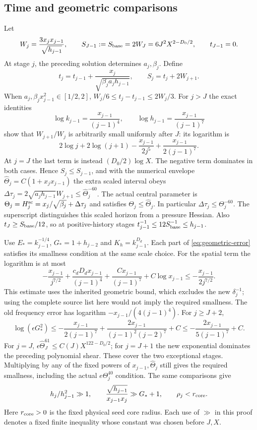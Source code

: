 \documentclass[11pt]{article}
\theoremstyle{definition}
\begin{document}
\subsection{Time and geometric comparisons}
Let
\[
 W_j=\frac{3x_jx_{j-1}}{\sqrt{h_{j-1}}},\qquad
 S_{J-1}:=S_{\rm base}=2W_J=6J^2X^{2-D_0/2},\qquad t_{J-1}=0.
\]
At stage $j$, the preceding solution determines $a_j,\beta_j$.
Define
\begin{equation}\label{eq:actual-times}
 t_j=t_{j-1}+\frac{x_j}{\sqrt{\beta_ja_jh_{j-1}}},
 \qquad S_j=t_j+2W_{j+1}.
\end{equation}
When $a_j,\beta_jx_{j-1}^2\in[1/2,2]$,
$W_j/6\leq t_j-t_{j-1}\leq2W_j/3$.
For $j>J$ the exact identities
\[
 \log k_{j-1}=\frac{x_{j-1}}{(j-1)^4},\qquad
 \log h_{j-1}=\frac{x_{j-1}}{(j-1)^7}
\]
show that $W_{j+1}/W_j$ is arbitrarily small uniformly after $J$:
its logarithm is
\[
 2\log j+2\log(j+1)-\frac{x_{j-1}}{2j^5}
                    +\frac{x_{j-1}}{2(j-1)^7}.
\]
At $j=J$ the last term is instead $(D_0/2)\log X$.
The negative term dominates in both cases. Hence $S_j\leq S_{j-1}$,
and with the numerical envelope
$\widehat\Theta_j=C(1+x_jx_{j-1})$ the extra scaled interval obeys
$\Delta\tau_j=2\sqrt{a_jh_{j-1}}W_{j+1}\leq\widehat\Theta_j^{-60}$.
The actual central parameter is
$\Theta_j=H_j^{\rm sc}=x_j/\sqrt{\beta_j}+\Delta\tau_j$
and satisfies $\Theta_j\leq\widehat\Theta_j$. In particular
$\Delta\tau_j\leq\Theta_j^{-60}$. The superscript distinguishes
this scaled horizon from a pressure Hessian.
Also $t_J\geq S_{\rm base}/12$, so at positive-history stages
$t_{j-1}^{-1}\leq12S_{\rm base}^{-1}\leq h_{j-1}$.

Use $E_*=k_{j-1}^{-1/4}$, $G_*=1+h_{j-2}$ and
$K_h=k_{j-1}^{D_d}$. Each part of \eqref{eq:geometric-error} satisfies
its smallness condition at the same scale choice. For the spatial term the
logarithm is at most
\[
 -\frac{x_{j-1}}{j^{7/2}}+
       \frac{c_dD_dx_{j-1}}{(j-1)^4}
       +\frac{Cx_{j-1}}{(j-1)^7}+C\log x_{j-1}
 \leq-\frac{x_{j-1}}{2j^{7/2}}.
\]
This estimate uses the inherited geometric bound, which excludes the new
$\delta_j^{-1}$; using the complete source list here would not imply the required smallness.
The old frequency error has logarithm
$-x_{j-1}/(4(j-1)^4)$. For $j\geq J+2$,
\[
 \log(\epsilon G_*^2)\leq
 -\frac{x_{j-1}}{2(j-1)^7}+
 \frac{2x_{j-1}}{(j-1)^2(j-2)^7}+C
 \leq-\frac{2x_{j-1}}{5(j-1)^7}+C.
\]
For $j=J$, $\epsilon\widehat\Theta_J^{61}\leq C(J)X^{122-D_0/2}$;
for $j=J+1$ the new exponential dominates the preceding polynomial shear.
These cover the two exceptional stages. Multiplying by any of the
fixed powers of $x_{j-1},\widehat\Theta_j$ still gives the required
smallness, including the actual $e\Theta_j^{40}$ condition.
The same comparisons give
\begin{equation}\label{eq:shear-separation}
 h_j/h_{j-1}^2\gg1,\qquad
 \frac{\sqrt{h_{j-1}}}{x_{j-1}x_j}\gg G_*+1,\qquad
 \rho_j<r_{\rm core}.
\end{equation}
Here $r_{\rm core}>0$ is the fixed physical seed core radius.
Each use of $\gg$ in this proof denotes a fixed finite inequality whose
constant was chosen before $J,X$.
\end{document}
